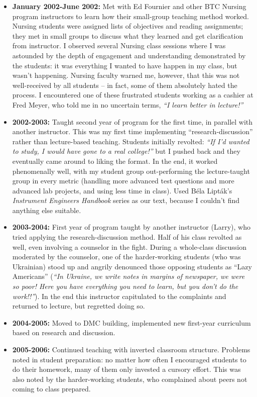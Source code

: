 \begin{itemize}
\vskip 10pt
\item{} {\bf January 2002-June 2002:} Met with Ed Fournier and other BTC Nursing program instructors to learn how their small-group teaching method worked.  Nursing students were assigned lists of objectives and reading assignments; they met in small groups to discuss what they learned and get clarification from instructor.  I observed several Nursing class sessions where I was astounded by the depth of engagement and understanding demonstrated by the students: it was everything I wanted to have happen in my class, but wasn't happening.  Nursing faculty warned me, however, that this was not well-received by all students -- in fact, some of them absolutely hated the process.  I encountered one of these frustrated students working as a cashier at Fred Meyer, who told me in no uncertain terms, {\it ``I learn better in lecture!''}
\vskip 10pt
\item{} {\bf 2002-2003:} Taught second year of program for the first time, in parallel with another instructor.  This was my first time implementing ``research-discussion'' rather than lecture-based teaching.  Students initially revolted: {\it ``If I'd wanted to study, I would have gone to a real college!''} but I pushed back and they eventually came around to liking the format.  In the end, it worked phenomenally well, with my student group out-performing the lecture-taught group in every metric (handling more advanced test questions and more advanced lab projects, and using less time in class).  Used B\'ela Lipt\'ak's {\it Instrument Engineers Handbook} series as our text, because I couldn't find anything else suitable.
\vskip 10pt
\item{} {\bf 2003-2004:} First year of program taught by another instructor (Larry), who tried applying the research-discussion method.  Half of his class revolted as well, even involving a counselor in the fight.  During a whole-class discussion moderated by the counselor, one of the harder-working students (who was Ukrainian) stood up and angrily denounced those opposing students as ``Lazy Americans'' ({\it ``In Ukraine, we write notes in margins of newspaper, we were so poor!  Here you have everything you need to learn, but you don't do the work!!''}).  In the end this instructor capitulated to the complaints and returned to lecture, but regretted doing so.
\vskip 10pt
\item{} {\bf 2004-2005:} Moved to DMC building, implemented new first-year curriculum based on research and discussion.
\vskip 10pt
\item{} {\bf 2005-2006:} Continued teaching with inverted classroom structure.  Problems noted in student preparation: no matter how often I encouraged students to do their homework, many of them only invested a cursory effort.  This was also noted by the harder-working students, who complained about peers not coming to class prepared.

\end{itemize}
